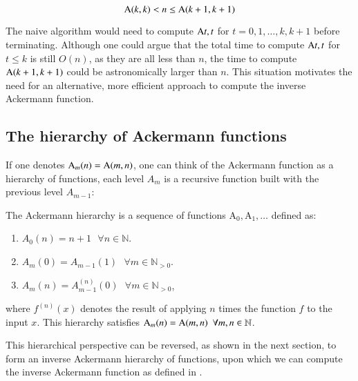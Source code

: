 \begin{equation}
\text{A}(k, k) < n \le \text{A}(k+1, k+1)
\end{equation}

The naive algorithm would need to compute $\text{A}{t, t}$ for $t = 0, 1, \ldots, k, k+1$ before terminating. Although one could argue that the total time to compute $\text{A}{t, t}$ for $t\le k$ is still $O(n)$, as they are all less than $n$, the time to compute $\text{A}(k+1, k+1)$ could be astronomically larger than $n$. This situation motivates the need for an alternative, more efficient approach to compute the inverse Ackermann function.

\subsection{The hierarchy of Ackermann functions}

If one denotes $\text{A}_m(n) = \text{A}(m, n)$, one can think of the Ackermann function as a hierarchy of functions, each level $A_m$ is a recursive function built with the previous level $A_{m-1}$:

\begin{defn} \label{defn: ack_hier}
	The Ackermann hierarchy is a sequence of functions $\text{A}_0, \text{A}_1, \ldots $ defined as:
	\begin{enumerate}
		\item $A_0(n) = n + 1 \ \ \ \forall n\in \mathbb{N}$.
		\item $A_m(0) = A_{m-1}(1) \ \ \ \forall m\in \mathbb{N}_{>0}$.
		\item $A_{m}(n) = A_{m-1}^{(n)}(0) \ \ \ \forall m\in \mathbb{N}_{>0}$,
	\end{enumerate}
	\noindent where $f^{(n)}(x)$ denotes the result of applying $n$ times the function $f$ to the input $x$. This hierarchy satisfies $\text{A}_m(n) = \text{A}(m, n) \ \ \forall m, n\in \mathbb{N}$.
\end{defn}

This hierarchical perspective can be reversed, as shown in the next section, to form an inverse Ackermann hierarchy of functions, upon which we can compute the inverse Ackermann function as defined in .